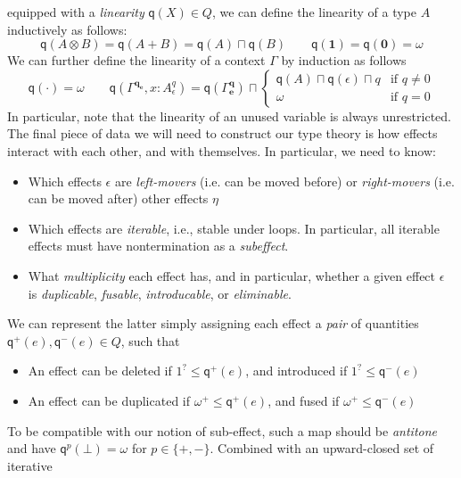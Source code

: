 \documentclass[acmsmall,screen,review]{acmart}
\newcommand{\mb}[1]{\ensuremath{\mathbf{#1}}}
\newcommand{\ms}[1]{\ensuremath{\mathsf{#1}}}
\newcommand{\delq}{1^?}
\newcommand{\cpyq}{\omega^+}
\newcommand{\topq}{\omega}
\newcommand{\alquant}{\ms{q}}
\begin{document}
equipped with a \emph{linearity} $\alquant(X) \in Q$, we can define the linearity of a type $A$
inductively as follows:
\begin{equation}
  \alquant(A \otimes B) = \alquant(A + B) = \alquant(A) \sqcap \alquant(B) \qquad
  \alquant(\mb{1}) = \alquant(\mb{0}) = \topq
\end{equation}
We can further define the linearity of a context $\Gamma$ by induction as follows
\begin{equation}
  \alquant(\cdot) = \topq \qquad
  \alquant(\Gamma^{\mb{q}_{\mb{e}}}, x : A^q_\epsilon) 
    = \alquant(\Gamma^{\mb{q}}_{\mb{e}}) \sqcap \begin{cases}
    \alquant(A) \sqcap \alquant(\epsilon) \sqcap q & \text{if } q \neq 0 \\
    \topq & \text{if } q = 0
  \end{cases}
\end{equation}
In particular, note that the linearity of an unused variable is always unrestricted.
%
The final piece of data we will need to construct our type theory is how effects interact with each
other, and with themselves. In particular, we need to know:
\begin{itemize}
  \item Which effects $\epsilon$ are \emph{left-movers} (i.e. can be moved before) or
  \emph{right-movers} (i.e. can be moved after) other effects $\eta$
  \item Which effects are \emph{iterable}, i.e., stable under loops. In particular, all iterable
  effects must have nontermination as a \emph{subeffect}.
  \item What \emph{multiplicity} each effect has, and in particular, whether a given effect
  $\epsilon$ is \emph{duplicable}, \emph{fusable}, \emph{introducable}, or \emph{eliminable}.
\end{itemize}
We can represent the latter simply assigning each effect a \emph{pair} of quantities $\alquant^+(e),
\alquant^-(e) \in Q$, such that
\begin{itemize}
  \item An effect can be deleted if $\delq \leq \alquant^+(e)$, and introduced if $\delq \leq
  \alquant^-(e)$
  \item An effect can be duplicated if $\cpyq \leq \alquant^+(e)$, and fused if $\cpyq \leq
  \alquant^-(e)$
\end{itemize}
To be compatible with our notion of sub-effect, such a map should be \emph{antitone} and have
$\alquant^p(\bot) = \topq$ for $p \in \{+, -\}$. Combined with an upward-closed set of iterative
\end{document}
